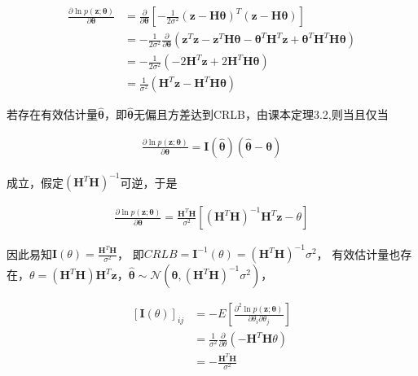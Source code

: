 \documentclass[fontset=windows]{article}
\numberwithin{figure}{section}
\begin{document}
\begin{align*}
    \frac{\partial \ln p(\mathbf{z};\boldsymbol{\theta})}{\partial \boldsymbol{\theta}}
     & =\frac{\partial}{\partial \boldsymbol{\theta}}\left[-\frac{1}{2\sigma^2}
    (\mathbf{z-H}\boldsymbol{\theta})^T(\mathbf{z-H}\boldsymbol{\theta})\right]                               \\
     & = -\frac{1}{2\sigma^2}\frac{\partial}{\partial \boldsymbol{\theta}}\left(\mathbf{z}^T\mathbf{z}
    -\mathbf{z}^T\mathbf{H}\boldsymbol{\theta}-\boldsymbol{\theta}^T\mathbf{H}^T\mathbf{z}+
    \boldsymbol{\theta}^T\mathbf{H}^T\mathbf{H}\boldsymbol{\theta}\right)                                     \\
     & =-\frac{1}{2\sigma^2}\left(-2\mathbf{H}^T\mathbf{z}+2\mathbf{H}^T\mathbf{H}\boldsymbol{\theta} \right) \\
     & =\frac{1}{\sigma^2}\left(\mathbf{H}^T\mathbf{z}-\mathbf{H}^T\mathbf{H}\boldsymbol{\theta} \right)
\end{align*}

若存在有效估计量\(\hat{\boldsymbol{\theta}}\)，即\(\hat{\boldsymbol{\theta}}\)无偏且方差达到CRLB，由课本定理3.2,则当且仅当

\begin{align*}
    \frac{\partial \ln p(\mathbf{z};\boldsymbol{\theta})}{\partial \boldsymbol{\theta}}=
    \mathbf{I}(\hat{\boldsymbol{\theta}})(\hat{\boldsymbol{\theta}}-\boldsymbol{\theta})
\end{align*}

成立，假定\((\mathbf{H}^T\mathbf{H})^{-1}\)可逆，于是

\begin{align*}
    \frac{\partial \ln p(\mathbf{z};\boldsymbol{\theta})}{\partial \mathbf{\boldsymbol{\theta}}}=
    \frac{\mathbf{H}^T\mathbf{H}}{\sigma^2}\left[\left(\mathbf{H}^T\mathbf{H}\right)^{-1}
        \mathbf{H}^T\mathbf{z}-\theta\right]
\end{align*}

因此易知\(\mathbf{I}(\theta)=\frac{\mathbf{H}^T\mathbf{H}}{\sigma^2}\)，
即\(CRLB=\mathbf{I}^{-1}(\theta)=\left(\mathbf{H}^T\mathbf{H}\right)^{-1}\sigma^2\)，
有效估计量也存在，\(\theta=\left(\mathbf{H}^T\mathbf{H}\right)\mathbf{H}^T\mathbf{z}，
\hat{\boldsymbol{\theta}} \sim \mathcal{N} (\boldsymbol{\theta},
\left(\mathbf{H}^T\mathbf{H}\right)^{-1}\sigma^2)\)，

\begin{align*}
    \left[\mathbf{I}(\theta)\right]_{ij}
     & =-E\left[\frac{\partial^2 \ln p(\mathbf{z};\boldsymbol{\theta})}{\partial \theta_i \partial \theta_j}\right] \\
     & =\frac{1}{\sigma^2}\frac{\partial}{\partial \theta}\left(-\mathbf{H}^T\mathbf{H}\theta\right)                \\
     & =-\frac{\mathbf{H}^T\mathbf{H}}{\sigma^2}                                                                    \\
\end{align*}
\end{document}
